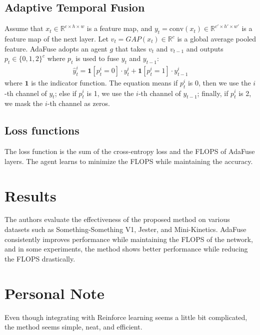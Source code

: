 \documentclass[10pt,twocolumn,letterpaper]{article}
\begin{document}
\subsection{Adaptive Temporal Fusion}
Assume that $x_t \in \mathbb{R}^{c \times h \times w}$ is a feature map, and $y_t=\text{conv}(x_t) \in \mathbb{R}^{c' \times h' \times w'}$ is a feature map of the next layer. Let $v_t = GAP(x_t) \in \mathbb{R}^{c}$ is a global average pooled feature. AdaFuse adopts an agent $g$ that takes $v_t$ and $v_{t-1}$ and outputs $p_t \in \{0, 1, 2\}^{c}$ where $p_t$ is used to fuse $y_t$ and $y_{t-1}$:
\begin{align*}
	\hat{y}^i_t = \mathbf{1}[p^i_t = 0] \cdot y^i_t + \mathbf{1}[p^i_t = 1] \cdot y^i_{t-1}
\end{align*}
where $\mathbf{1}$ is the indicator function. The equation means if $p^i_t$ is 0, then we use the $i$-th channel of $y_t$; else if $p^i_t$ is 1, we use the $i$-th channel of $y_{t-1}$; finally, if $p^i_t$ is 2, we mask the $i$-th channel as zeros.

\subsection{Loss functions}
The loss function is the sum of the cross-entropy loss and the FLOPS of AdaFuse layers. The agent learns to minimize the FLOPS while maintaining the accuracy.

\section{Results}
The authors evaluate the effectiveness of the proposed method on various datasets such as Something-Something V1, Jester, and Mini-Kinetics. 
AdaFuse consistently improves performance while maintaining the FLOPS of the network, and in some experiments, the method shows better performance while reducing the FLOPS drastically. 

\section{Personal Note}
Even though integrating with Reinforce learning seems a little bit complicated, the method seems simple, neat, and efficient. 

{\small


}
\end{document}
